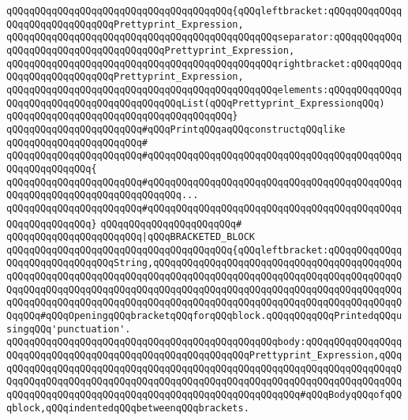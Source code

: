\verb|qQQqqQQqqQQqqQQqqQQqqQQqqQQqqQQqqQQqqQQq{qQQqleftbracket:qQQqqQQqqQQqqQQqqQQqqQQqqQQqqQQqPrettyprint_Expression,|\newline
\verb|qQQqqQQqqQQqqQQqqQQqqQQqqQQqqQQqqQQqqQQqqQQqqQQqseparator:qQQqqQQqqQQqqQQqqQQqqQQqqQQqqQQqqQQqqQQqPrettyprint_Expression,|\newline
\verb|qQQqqQQqqQQqqQQqqQQqqQQqqQQqqQQqqQQqqQQqqQQqqQQqrightbracket:qQQqqQQqqQQqqQQqqQQqqQQqqQQqPrettyprint_Expression,|\newline
\verb|qQQqqQQqqQQqqQQqqQQqqQQqqQQqqQQqqQQqqQQqqQQqqQQqelements:qQQqqQQqqQQqqQQqqQQqqQQqqQQqqQQqqQQqqQQqqQQqList(qQQqPrettyprint_ExpressionqQQq)|\newline
\verb|qQQqqQQqqQQqqQQqqQQqqQQqqQQqqQQqqQQqqQQq}|\newline
\newline
\newline
\verb|qQQqqQQqqQQqqQQqqQQqqQQq#qQQqPrintqQQqaqQQqconstructqQQqlike|\newline
\verb|qQQqqQQqqQQqqQQqqQQqqQQq#|\newline
\verb|qQQqqQQqqQQqqQQqqQQqqQQq#qQQqqQQqqQQqqQQqqQQqqQQqqQQqqQQqqQQqqQQqqQQqqQQqqQQqqQQqqQQq{|\newline
\verb|qQQqqQQqqQQqqQQqqQQqqQQq#qQQqqQQqqQQqqQQqqQQqqQQqqQQqqQQqqQQqqQQqqQQqqQQqqQQqqQQqqQQqqQQqqQQqqQQqqQQq...|\newline
\verb|qQQqqQQqqQQqqQQqqQQqqQQq#qQQqqQQqqQQqqQQqqQQqqQQqqQQqqQQqqQQqqQQqqQQqqQQqqQQqqQQqqQQq}|\newline
\verb|qQQqqQQqqQQqqQQqqQQqqQQq#|\newline
\verb|qQQqqQQqqQQqqQQqqQQqqQQq|\verb#|qQQqBRACKETED_BLOCK#\newline
\verb|qQQqqQQqqQQqqQQqqQQqqQQqqQQqqQQqqQQqqQQq{qQQqleftbracket:qQQqqQQqqQQqqQQqqQQqqQQqqQQqqQQqString,qQQqqQQqqQQqqQQqqQQqqQQqqQQqqQQqqQQqqQQqqQQqqQQqqQQqqQQqqQQqqQQqqQQqqQQqqQQqqQQqqQQqqQQqqQQqqQQqqQQqqQQqqQQqqQQqqQQqqQQqqQQqqQQqqQQqqQQqqQQqqQQqqQQqqQQqqQQqqQQqqQQqqQQqqQQqqQQqqQQqqQQqqQQqqQQqqQQqqQQqqQQqqQQqqQQqqQQqqQQqqQQqqQQqqQQqqQQqqQQqqQQqqQQqqQQqqQQqqQQq#qQQqOpeningqQQqbracketqQQqforqQQqblock.qQQqqQQqqQQqPrintedqQQqusingqQQq'punctuation'.|\newline
\verb|qQQqqQQqqQQqqQQqqQQqqQQqqQQqqQQqqQQqqQQqqQQqqQQqbody:qQQqqQQqqQQqqQQqqQQqqQQqqQQqqQQqqQQqqQQqqQQqqQQqqQQqqQQqqQQqPrettyprint_Expression,qQQqqQQqqQQqqQQqqQQqqQQqqQQqqQQqqQQqqQQqqQQqqQQqqQQqqQQqqQQqqQQqqQQqqQQqqQQqqQQqqQQqqQQqqQQqqQQqqQQqqQQqqQQqqQQqqQQqqQQqqQQqqQQqqQQqqQQqqQQqqQQqqQQqqQQqqQQqqQQqqQQqqQQqqQQqqQQqqQQqqQQqqQQqqQQqqQQq#qQQqBodyqQQqofqQQqblock,qQQqindentedqQQqbetweenqQQqbrackets.|\newline
